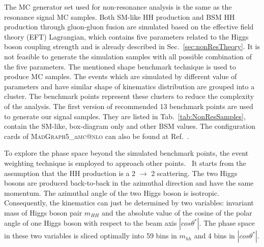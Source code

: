 The MC generator set used for non-resonance analysis is the same as the resonance signal MC samples.
Both SM-like HH production and BSM HH production through gluon-gluon fusion are simulated based on the effective field theory (EFT) Lagrangian, which contains five parameters related to the Higgs boson coupling strength and is already described in Sec.~\ref{sec:nonResTheory}.
It is not feasible to generate the simulation samples with all possible combination of the five parameters.
The mentioned shape benchmark technique is used to produce MC samples.
The events which are simulated by different value of parameters and have similar shape of kinematics distribution are grouped into a cluster.
The benchmark points represent these clusters to reduce the complexity of the analysis.
The first version of recommended 13 benchmark points are used to generate our signal samples.
They are listed in Tab.~\ref{tab:NonResSamples}, contain the SM-like, box-diagram only and other BSM values.
The configuration cards of {\textsc{MadGraph5}\_a\textsc{mc@nlo}\xspace} can also be found at Ref.~\cite{MadCard}.

To explore the phase space beyond the simulated benchmark points, the event weighting technique is employed to approach other points.~\cite{1710.08261}
It starts from the assumption that the HH production is a 2 $\rightarrow$ 2 scattering.
The two Higgs bosons are produced back-to-back in the azimuthal direction and have the same momentum.
The azimuthal angle of the two Higgs boson is isotropic.
Consequently, the kinematics can just be determined by two variables: invariant mass of Higgs boson pair $m_{HH}$ and the absolute value of the cosine of the polar angle of one Higgs boson with respect to the beam axis $|cos \theta^{*}|$.
The phase space in these two variables is sliced optimally into 59 bins in $m_{hh}$ and 4 bins in $|cos \theta^{*}|$.

